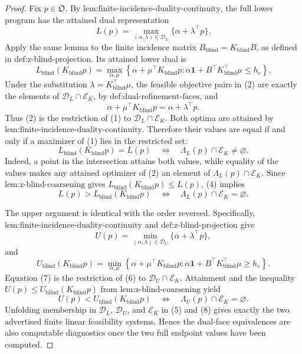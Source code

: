 \documentclass{article}
\begin{document}
\begin{proof}
Fix \(p\in\mathfrak O\).  By \(\text{lem:finite-incidence-duality-continuity}\), the full lower program has the attained dual representation
\[
 L(p)=\max_{(\alpha,\lambda)\in\mathcal D_L}
       \{\alpha+\lambda^{\top}p\}.
\tag{1}
\]
Apply the same lemma to the finite incidence matrix \(B_{\mathrm{blind}}=K_{\mathrm{blind}}B\), as defined in \(\text{def:z-blind-projection}\).  Its attained lower dual is
\[
 L_{\mathrm{blind}}(K_{\mathrm{blind}}p)
 =\max_{\alpha,\mu}
 \left\{\alpha+\mu^{\top}K_{\mathrm{blind}}p:
 \alpha\mathbf 1+B^{\top}K_{\mathrm{blind}}^{\top}\mu\leq h_e\right\}.
\tag{2}
\]
Under the substitution \(\lambda=K_{\mathrm{blind}}^{\top}\mu\), the feasible objective pairs in (2) are exactly the elements of \(\mathcal D_L\cap\mathcal E_K\), by \(\text{def:dual-refinement-faces}\), and
\[
 \alpha+\mu^{\top}K_{\mathrm{blind}}p
 =\alpha+\lambda^{\top}p.
\tag{3}
\]
Thus (2) is the restriction of (1) to \(\mathcal D_L\cap\mathcal E_K\).  Both optima are attained by \(\text{lem:finite-incidence-duality-continuity}\).  Therefore their values are equal if and only if a maximizer of (1) lies in the restricted set:
\[
 L_{\mathrm{blind}}(K_{\mathrm{blind}}p)=L(p)
 \quad\Longleftrightarrow\quad
 \Lambda_L(p)\cap\mathcal E_K\neq\varnothing.
\tag{4}
\]
Indeed, a point in the intersection attains both values, while equality of the values makes any attained optimizer of (2) an element of \(\Lambda_L(p)\cap\mathcal E_K\).  Since \(\text{lem:z-blind-coarsening}\) gives
\(L_{\mathrm{blind}}(K_{\mathrm{blind}}p)\leq L(p)\), (4) implies
\[
 L(p)>L_{\mathrm{blind}}(K_{\mathrm{blind}}p)
 \quad\Longleftrightarrow\quad
 \Lambda_L(p)\cap\mathcal E_K=\varnothing.
\tag{5}
\]

The upper argument is identical with the order reversed.  Specifically, \(\text{lem:finite-incidence-duality-continuity}\) and \(\text{def:z-blind-projection}\) give
\[
 U(p)=\min_{(\alpha,\lambda)\in\mathcal D_U}
       \{\alpha+\lambda^{\top}p\},
\tag{6}
\]
and
\[
 U_{\mathrm{blind}}(K_{\mathrm{blind}}p)
 =\min_{\alpha,\mu}
 \left\{\alpha+\mu^{\top}K_{\mathrm{blind}}p:
 \alpha\mathbf 1+B^{\top}K_{\mathrm{blind}}^{\top}\mu\geq h_e\right\}.
\tag{7}
\]
Equation (7) is the restriction of (6) to \(\mathcal D_U\cap\mathcal E_K\).  Attainment and the inequality
\(U(p)\leq U_{\mathrm{blind}}(K_{\mathrm{blind}}p)\) from \(\text{lem:z-blind-coarsening}\) yield
\[
 U(p)<U_{\mathrm{blind}}(K_{\mathrm{blind}}p)
 \quad\Longleftrightarrow\quad
 \Lambda_U(p)\cap\mathcal E_K=\varnothing.
\tag{8}
\]
Unfolding membership in \(\mathcal D_L\), \(\mathcal D_U\), and \(\mathcal E_K\) in (5) and (8) gives exactly the two advertised finite linear feasibility systems.  Hence the dual-face equivalences are also computable diagnostics once the two full endpoint values have been computed.


\end{proof}
\end{document}
